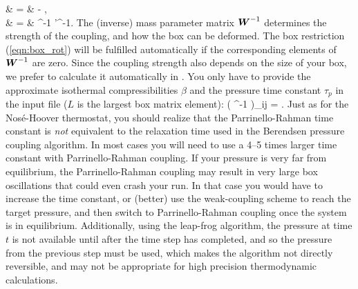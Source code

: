 \documentclass[11pt,a4paper,twoside]{article}
\begin{document}
\bea {} & = &  -
  , \\  & = & ^{-1}  '^{-1}.  \eea The (inverse) mass parameter matrix
$\mbox{\boldmath ${W}$}^{-1}$ determines the strength of the coupling, and how the box
can be deformed.  The box restriction (\ref{eqn:box_rot}) will be
fulfilled automatically if the corresponding elements of $\mbox{\boldmath ${W}$}^{-1}$
are zero. Since the coupling strength also depends on the size of your
box, we prefer to calculate it automatically in {\gromacs}.  You only
have to provide the approximate isothermal compressibilities
{\boldmath $\beta$} and the pressure time constant $\tau_p$ in the
input file ($L$ is the largest box matrix element): \beq \left(
^{-1} \right)_{ij} = .
\eeq Just as for the Nos{\'e}-Hoover thermostat, you should realize
that the Parrinello-Rahman time constant is {\em not} equivalent to
the relaxation time used in the Berendsen pressure coupling algorithm.
In most cases you will need to use a 4--5 times larger time constant
with Parrinello-Rahman coupling. If your pressure is very far from
equilibrium, the Parrinello-Rahman coupling may result in very large
box oscillations that could even crash your run.  In that case you
would have to increase the time constant, or (better) use the weak-coupling
scheme to reach the target pressure, and then switch to
Parrinello-Rahman coupling once the system is in equilibrium.
Additionally, using the leap-frog algorithm, the pressure at time $t$
is not available until after the time step has completed, and so the
pressure from the previous step must be used, which makes the algorithm
not directly reversible, and may not be appropriate for high precision
thermodynamic calculations.
\end{document}
